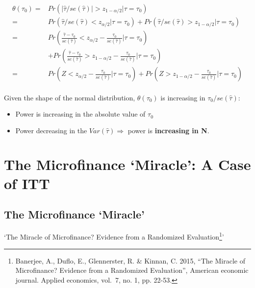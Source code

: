 \documentclass[
  letterpaper,
  DIV=11,
  numbers=noendperiod]{scrreprt}
\providecommand{\tightlist}{%
  \setlength{\itemsep}{0pt}\setlength{\parskip}{0pt}}\usepackage{longtable,booktabs,array}
\theoremstyle{definition}
\theoremstyle{remark}
\begin{document}
\[
        \begin{align*}
            \theta(\tau_0)=&Pr(|\hat{\tau}/se(\hat{\tau})|>z_{1-\alpha/2}|\tau=\tau_0) \\
            =&Pr(\hat{\tau}/se(\hat{\tau})<z_{\alpha/2}|\tau=\tau_0)+Pr(\hat{\tau}/se(\hat{\tau})>z_{1-\alpha/2}|\tau=\tau_0) \\
            =&Pr\left(\frac{\hat{\tau}-\tau_0}{se(\hat{\tau})}<z_{\alpha/2}-\frac{\tau_0}{se(\hat{\tau})}|\tau=\tau_0\right)\\
            &+Pr\left(\frac{\hat{\tau}-\tau_0}{se(\hat{\tau})}>z_{1-\alpha/2}-\frac{\tau_0}{se(\hat{\tau})}|\tau=\tau_0\right) \\
            =&Pr\left(Z<z_{\alpha/2}-\frac{\tau_0}{se(\hat{\tau})}|\tau=\tau_0\right)+Pr\left(Z>z_{1-\alpha/2}-\frac{\tau_0}{se(\hat{\tau})}|\tau=\tau_0\right)
        \end{align*}
\]\\
Given the shape of the normal distribution, \(\theta(\tau_0)\) is
increasing in \(\tau_0/se(\hat{\tau})\):

\par

\begin{itemize}
\tightlist
\item
  Power is increasing in the absolute value of \(\tau_0\)
\item
  Power decreasing in the \(Var(\hat{\tau})\Rightarrow\) power is
  \textbf{increasing in N}.
\end{itemize}

\section{The Microfinance `Miracle': A Case of
ITT}\label{the-microfinance-miracle-a-case-of-itt}

\subsection{The Microfinance `Miracle'}\label{the-microfinance-miracle}

`{The Miracle of Microfinance? Evidence from a Randomized
Evaluation}\footnote{{Banerjee, A., Duflo, E., Glennerster, R. \&
  Kinnan, C. 2015, ``The Miracle of Microfinance? Evidence from a
  Randomized Evaluation'', American economic journal. Applied economics,
  vol.~7, no. 1, pp. 22-53.}}'

\par
\end{document}
